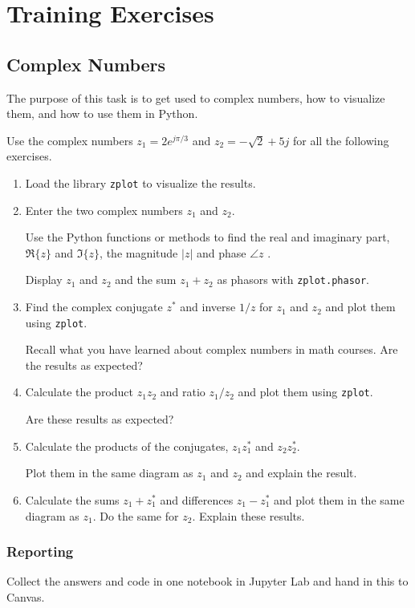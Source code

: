 \section{Training Exercises}

\subsection{Complex Numbers}
The purpose of this task is to get used to complex numbers, how to visualize them, and how to use them in Python.

Use the complex numbers $z_1 = 2e^{j\pi/3}$ and $z_2= -\sqrt{2} + 5j$ for all the following exercises.

\begin{enumerate}[1)]
	\item Load the library \verb|zplot| to visualize the results.

	\item Enter the two complex numbers $z_1$ and $z_2$. 
	
		Use the Python functions or methods to find the real and imaginary part, $\Re\{z\}$ and $\Im\{z\}$, the magnitude $|z|$ and phase $\angle z$ .
	
		Display $z_1$ and $z_2$ and the sum $z_1+z_2$ as phasors with \verb|zplot.phasor|.

	\item Find the complex conjugate $z^*$ and inverse $1/z$ for $z_1$ and $z_2$ and plot them using \verb|zplot|.
	
		Recall what you have learned about complex numbers in math courses. Are the results as expected?
			
	\item Calculate the product $z_1 z_2$ and ratio $z_1/z_2$ and plot them using \verb|zplot|. 
	
		Are these results as expected?

	\item Calculate the products of the conjugates, $z_1 z_1^*$ and $z_2 z_2^*$. 
	
	Plot them in the same diagram as $z_1$ and $z_2$ and explain the result.

	\item Calculate the sums $z_1+z_1^*$ and differences $z_1-z_1^*$ and plot them in the same diagram as $z_1$. Do the same for $z_2$. Explain these results.
		
\end{enumerate}

\subsubsection*{Reporting}	
Collect the answers and code in one notebook in Jupyter Lab and hand in this to Canvas.
		
